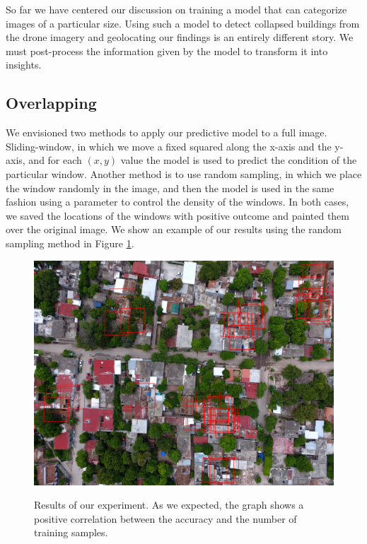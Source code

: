 So far we have centered our discussion on training a model that can categorize images of a particular size. Using such a model to detect collapsed buildings from the drone imagery and geolocating our findings is an entirely different story. We must post-process the information given by the model to transform it into insights.\\

\subsection{Overlapping}

We envisioned two methods to apply our predictive model to a full image. Sliding-window, in which we move a fixed squared along the x-axis and the y-axis, and for each $(x,y)$ value the model is used to predict the condition of the particular window. Another method is to use random sampling, in which we place the window randomly in the image, and then the model is used in the same fashion using a parameter to control the density of the windows. In both cases, we saved the locations of the windows with positive outcome and painted them over the original image. We show an example of our results using the random sampling method in Figure \ref{fig:overlap}.\\

\begin{figure}[!h]
  \centering
  \includegraphics[width=\textwidth]{images/overlap.jpg}
  \label{fig:overlap}
  \caption{Results of our experiment. As we expected, the graph shows a positive correlation between the accuracy and the number of training samples.}
\end{figure}





